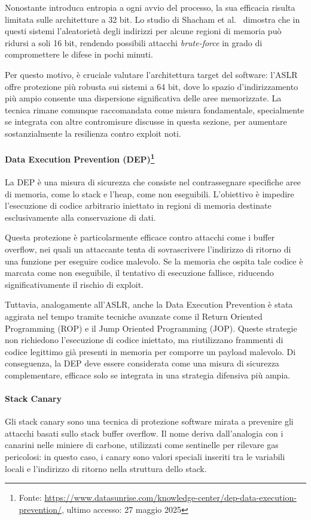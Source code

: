 Nonostante introduca entropia a ogni avvio del processo, la sua efficacia risulta
limitata sulle architetture a 32 bit. Lo studio di Shacham et al.~\cite{aslr_effectiveness}
dimostra che in questi sistemi l'aleatorietà degli indirizzi per alcune regioni di
memoria può ridursi a soli 16 bit, rendendo possibili attacchi \textit{brute-force}
in grado di compromettere le difese in pochi minuti.

Per questo motivo, è cruciale valutare l'architettura target del software: l'ASLR
offre protezione più robusta sui sistemi a 64 bit, dove lo spazio d'indirizzamento
più ampio consente una dispersione significativa delle aree memorizzate. La tecnica
rimane comunque raccomandata come misura fondamentale, specialmente se integrata
con altre contromisure discusse in questa sezione, per aumentare sostanzialmente
la resilienza contro exploit noti.

\paragraph{Data Execution Prevention (DEP)\protect\footnote{Fonte: \url{https://www.datasunrise.com/knowledge-center/dep-data-execution-prevention/},
ultimo accesso: 27 maggio 2025}}
La DEP è una misura di sicurezza che consiste nel contrassegnare specifiche aree
di memoria, come lo stack e l'heap, come non eseguibili. L'obiettivo è impedire l'esecuzione
di codice arbitrario iniettato in regioni di memoria destinate esclusivamente alla
conservazione di dati.

Questa protezione è particolarmente efficace contro attacchi come i buffer overflow,
nei quali un attaccante tenta di sovrascrivere l'indirizzo di ritorno di una
funzione per eseguire codice malevolo. Se la memoria che ospita tale codice è marcata
come non eseguibile, il tentativo di esecuzione fallisce, riducendo significativamente
il rischio di exploit.

Tuttavia, analogamente all'ASLR, anche la Data Execution Prevention è stata aggirata
nel tempo tramite tecniche avanzate come il Return Oriented Programming (ROP) e il
Jump Oriented Programming (JOP). Queste strategie non richiedono l'esecuzione di
codice iniettato, ma riutilizzano frammenti di codice legittimo già presenti in memoria
per comporre un payload malevolo. Di conseguenza, la DEP deve essere considerata
come una misura di sicurezza complementare, efficace solo se integrata in una
strategia difensiva più ampia.

\paragraph{Stack Canary}
Gli stack canary sono una tecnica di protezione software mirata a prevenire gli attacchi
basati sullo stack buffer overflow. Il nome deriva dall'analogia con i canarini
nelle miniere di carbone, utilizzati come sentinelle per rilevare gas pericolosi:
in questo caso, i canary sono valori speciali inseriti tra le variabili locali e
l'indirizzo di ritorno nella struttura dello stack.

